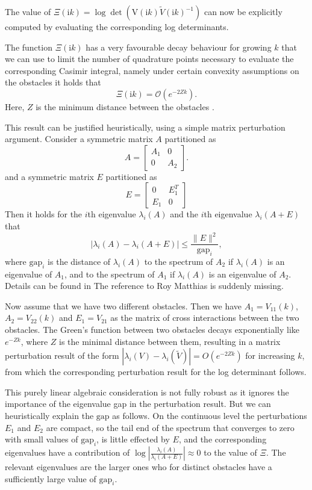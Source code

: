 The value of $\Xi(\mathrm{i}k) = \log\det(\mathrm{V}(\mathrm{i}k)\tilde{V}(\mathrm{i}k)^{-1})$ can now be explicitly computed by evaluating the corresponding log determinants.

The function $\Xi(\mathrm{i}k)$ has a very favourable decay behaviour for growing $k$ that we can use to limit the number of quadrature points necessary to evaluate the corresponding Casimir integral, namely under certain convexity assumptions on the obstacles it holds that
$$
\Xi(\mathrm{i}k) = \mathcal{O}(e^{-2Zk}).
$$
Here, $Z$ is the minimum distance between the obstacles  \cite[Theorem 4.1]{fang2022trace}.

This result can be justified heuristically, using a simple matrix perturbation argument. Consider a symmetric matrix $A$ partitioned as
$$
A = \begin{bmatrix}A_1 & 0\\
                              0   & A_2
       \end{bmatrix}.
$$
and a symmetric matrix $E$ partitioned as
$$
E= \begin{bmatrix}0 & E_1^T\\
     E_1 & 0
     \end{bmatrix}
$$
Then it holds for the $i$th eigenvalue $\lambda_i(A)$ and the $i$th eigenvalue $\lambda_i(A+E)$ that
$$
|\lambda_i(A) - \lambda_i(A+E)| \leq \frac{\|E\|^2}{\text{gap}_i},
$$
where $\text{gap}_i$ is the distance of $\lambda_i(A)$ to the spectrum of $A_2$ if $\lambda_i(A)$ is an eigenvalue of $A_1$, and to the spectrum of $A_1$ if $\lambda_i(A)$ is an eigenvalue of $A_2$. Details can be found in  \cite{nakatsukasa2015off} {\color{red} The reference to Roy Matthias is suddenly missing}.

Now assume that we have two different obstacles. Then we have $A_1 = V_{11}(k)$, $A_2 = V_{22}(k)$ and $E_1 = V_{21}$ as the matrix of cross interactions between the two obstacles. The Green's function between two obstacles decays exponentially like $e^{-Zk}$, where $Z$ is the minimal distance between them, resulting in a matrix perturbation result of the form $|\lambda_i(V) - \lambda_i(\tilde{V})| = O(e^{-2Zk})$ for increasing $k$, from which the corresponding perturbation result for the log determinant follows.

This purely linear algebraic consideration is not fully robust as it ignores the importance of the eigenvalue gap in the perturbation result. But we can heuristically explain the $\text{gap}$ as follows. On the continuous level the perturbations $E_1$ and $E_2$ are compact, so the tail end of the spectrum that converges to zero with small values of $\text{gap}_i$, is little effected by $E$, and the corresponding eigenvalues have a contribution of $\log \left|\frac{\lambda_i(A)}{\lambda_i(A+E)}\right| \approx 0$ to the value of $\Xi$. The relevant eigenvalues are the larger ones who for distinct obstacles have a sufficiently large value of $\text{gap}_i$.

